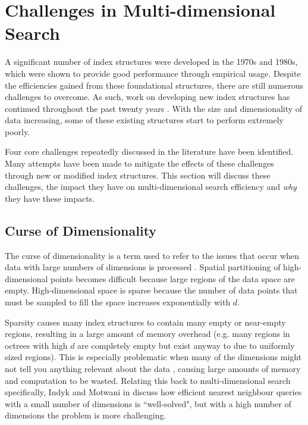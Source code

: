\section{Challenges in Multi-dimensional Search}
\label{sec:challenges}

A significant number of index structures were developed in the 1970s and 1980s, which were shown to provide good performance through empirical usage. Despite the efficiencies gained from these foundational structures, there are still numerous challenges to overcome. As such, work on developing new index structures has continued throughout the past twenty years \cite{md-structures-samet}. With the size and dimensionality of data increasing, some of these existing structures start to perform extremely poorly.

Four core challenges repeatedly discussed in the literature have been identified. Many attempts have been made to mitigate the effects of these challenges through new or modified index structures. This section will discuss these challenges, the impact they have on multi-dimensional search efficiency and \textit{why} they have these impacts.

\subsection{Curse of Dimensionality}
\label{sec:curse-of-dimensionality}

The curse of dimensionality is a term used to refer to the issues that occur when data with large numbers of dimensions is processed \cite{curse-of-dimensionality}. Spatial partitioning of high-dimensional points becomes difficult because large regions of the data space are empty. High-dimensional space is sparse because the number of data points that must be sampled to fill the space increases exponentially with $d$.

Sparsity causes many index structures to contain many empty or near-empty regions, resulting in a large amount of memory overhead (e.g. many regions in octrees with high $d$ are completely empty but exist anyway to due to uniformly sized regions). This is especially problematic when many of the dimensions might not tell you anything relevant about the data \cite{irrelevant-dimension}, causing large amounts of memory and computation to be wasted. Relating this back to multi-dimensional search specifically, Indyk and Motwani in \cite{knn-curse-of-dimensionality} discuss how efficient nearest neighbour queries with a small number of dimensions is ``well-solved", but with a high number of dimensions the problem is more challenging.

